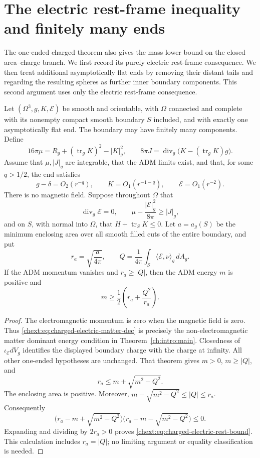 \section{The electric rest-frame inequality and finitely many ends}
\label{chext:sec:charged-rest-extensions}

The one-ended charged theorem also gives the mass lower bound on the
closed area--charge branch.  We first record its purely electric
rest-frame consequence.  We then treat additional asymptotically flat
ends by removing their distant tails and regarding the resulting
spheres as further inner boundary components.  This second argument
uses only the electric rest-frame consequence.

\begin{corollary}
\label{chext:cor:charged-electric-rest}
Let $(\Omega^3,g,K,\mathcal E)$ be smooth and orientable, with $\Omega$
connected and complete with its nonempty compact smooth boundary $S$
included, and with exactly one asymptotically flat end.  The boundary
may have finitely many components.  Define
\[
 16\pi\mu=R_g+(\operatorname{tr}_gK)^2-|K|_g^2,
 \qquad
 8\pi J=\operatorname{div}_g
       \bigl(K-(\operatorname{tr}_gK)g\bigr).
\]
Assume that $\mu,|J|_g$ are integrable, that the ADM limits exist, and
that, for some $q>1/2$, the end satisfies
\[
 g-\delta=O_2(r^{-q}),\qquad
 K=O_1(r^{-1-q}),\qquad \mathcal E=O_1(r^{-2}).
\]
There is no magnetic field.  Suppose throughout $\Omega$ that
\begin{equation}\label{chext:eq:charged-electric-matter-dec}
 \operatorname{div}_g\mathcal E=0,
 \qquad
 \mu-\frac{|\mathcal E|_g^2}{8\pi}\ge |J|_g,
\end{equation}
and on $S$, with normal into $\Omega$, that
$H+\operatorname{tr}_S K\le0$.
Let $a=a_g(S)$ be the minimum enclosing area over all smooth filled
cuts of the entire boundary, and put
\[
 r_a=\sqrt{\frac{a}{4\pi}},\qquad
 Q=\frac1{4\pi}\int_S
           \langle\mathcal E,\nu\rangle_g\,dA_g.
\]
If the ADM momentum vanishes and $r_a\ge |Q|$, then the ADM energy
$m$ is positive and
\begin{equation}\label{chext:eq:charged-electric-rest-bound}
 m\ge\frac12\left(r_a+\frac{Q^2}{r_a}\right).
\end{equation}
\end{corollary}

\begin{proof}
The electromagnetic momentum is zero when the magnetic field is
zero.  Thus \eqref{chext:eq:charged-electric-matter-dec} is precisely the
non-electromagnetic matter dominant energy condition in
Theorem~\ref{ch:intro:main}.  Closedness of
$\iota_{\mathcal E}dV_g$ identifies the displayed boundary charge
with the charge at infinity.  All other one-ended hypotheses are
unchanged.  That theorem gives $m>0$, $m\ge|Q|$, and
\[
 r_a\le m+\sqrt{m^2-Q^2}.
\]
The enclosing area is positive.  Moreover,
$m-\sqrt{m^2-Q^2}\le|Q|\le r_a$.  Consequently
\[
 \bigl(r_a-m+\sqrt{m^2-Q^2}\bigr)
 \bigl(r_a-m-\sqrt{m^2-Q^2}\bigr)\le0.
\]
Expanding and dividing by $2r_a>0$ proves
\eqref{chext:eq:charged-electric-rest-bound}.  This calculation includes
$r_a=|Q|$; no limiting argument or equality classification is needed.
\end{proof}

